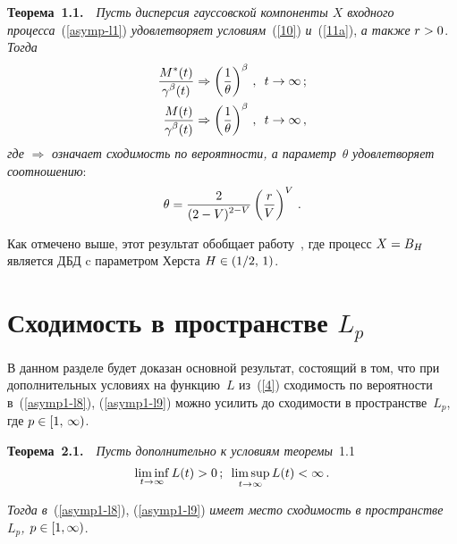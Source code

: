 \begin{multicols}{2}
\noindent
\textbf{Теорема~1.1.}\ \ 
\textit{Пусть дисперсия гауссовской компоненты $X$ входного
процесса}~(\ref{asymp-l1}) \textit{удовлетворяет условиям}~(\ref{10}) 
\textit{и}~(\ref{11a}), \textit{а также} $r\hm>0$. \textit{Тогда}
\begin{align}
\displaystyle\frac{\displaystyle M^*(t)\mathstrut}{\displaystyle \gamma^\beta(t)\mathstrut} &\Rightarrow
\left(\displaystyle\frac{\displaystyle 1\mathstrut}{\displaystyle \theta\mathstrut}\right)^\beta\,,\enskip t \to \infty\,;
\label{asymp1-l8}
\\
\displaystyle\frac{\displaystyle M(t)\mathstrut}{\displaystyle \gamma^\beta(t)\mathstrut} &\Rightarrow
\left(\displaystyle\frac{\displaystyle 1\mathstrut}{\displaystyle \theta\mathstrut}\right)^\beta\,,\enskip t \to \infty\,,
\label{asymp1-l9}
\end{align}
\textit{где} $\Rightarrow$ \textit{означает сходимость по вероятности, а параметр}~$\theta$ 
\textit{удовлетворяет соотношению}:
\begin{equation}
\theta=\displaystyle\frac{\displaystyle 2\mathstrut}{\displaystyle (2-V)^{2-V}\mathstrut}\left( \displaystyle\frac{\displaystyle r\mathstrut}{\displaystyle V\mathstrut}
\right)^V\,.\label{logbuff-l6}
\end{equation}

\smallskip


Как отмечено выше, этот результат  обобщает работу~\cite{Zeevi}, где
процесс $X\hm=B_H$ является ДБД  c параметром Херста  $H\hm\in (1/2,\,1)$.

\section{Сходимость в пространстве $L_p$ %
}

В данном разделе будет доказан основной результат, состоящий в том,
что при  дополнительных условиях  на функцию~$L$ из~(\ref{4})
сходимость по вероятности в~(\ref{asymp1-l8}), (\ref{asymp1-l9})
можно усилить до сходимости в пространстве~$L_p$, где
$p\hm\in[1,\,\infty)$.


\medskip

\noindent
\textbf{Теорема~2.1.}\ \ 
\textit{Пусть дополнительно к условиям теоремы}~1.1
\begin{equation}
\liminf\limits_{t\to \infty} L(t)>0\,;\enskip
\limsup\limits_{t\to \infty} L(t)<\infty\,.
\label{10a}
\end{equation}

\textit{Тогда в}~(\ref{asymp1-l8}), (\ref{asymp1-l9}) \textit{имеет место
сходимость в пространстве $L_p$, $p \hm\in [1,\infty)$}.


\smallskip



\end{multicols}
